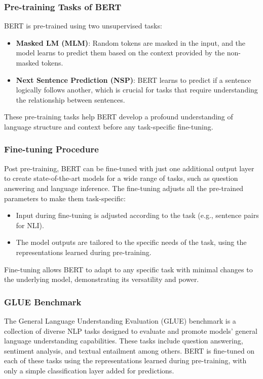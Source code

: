 \documentclass[11pt,xcolor={dvipsnames},hyperref={pdftex,pdfpagemode=UseNone,hidelinks,pdfdisplaydoctitle=true},usepdftitle=false]{beamer}
\begin{document}
\begin{frame}
\frametitle{Pre-training Tasks of BERT}
BERT is pre-trained using two unsupervised tasks:
\begin{itemize}
    \item \textbf{Masked LM (MLM)}: Random tokens are masked in the input, and the model learns to predict them based on the context provided by the non-masked tokens.
    \item \textbf{Next Sentence Prediction (NSP)}: BERT learns to predict if a sentence logically follows another, which is crucial for tasks that require understanding the relationship between sentences.
\end{itemize}
These pre-training tasks help BERT develop a profound understanding of language structure and context before any task-specific fine-tuning.
\end{frame}

\begin{frame}
\frametitle{Fine-tuning Procedure}
Post pre-training, BERT can be fine-tuned with just one additional output layer to create state-of-the-art models for a wide range of tasks, such as question answering and language inference. The fine-tuning adjusts all the pre-trained parameters to make them task-specific:
\begin{itemize}
    \item Input during fine-tuning is adjusted according to the task (e.g., sentence pairs for NLI).
    \item The model outputs are tailored to the specific needs of the task, using the representations learned during pre-training.
\end{itemize}
Fine-tuning allows BERT to adapt to any specific task with minimal changes to the underlying model, demonstrating its versatility and power.
\end{frame}
    
\begin{frame}
\frametitle{GLUE Benchmark}
The General Language Understanding Evaluation (GLUE) benchmark is a collection of diverse NLP tasks designed to evaluate and promote models' general language understanding capabilities. These tasks include question answering, sentiment analysis, and textual entailment among others. BERT is fine-tuned on each of these tasks using the representations learned during pre-training, with only a simple classification layer added for predictions.
\end{frame}
\end{document}
